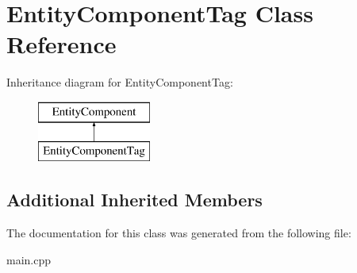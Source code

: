 \hypertarget{class_entity_component_tag}{}\section{Entity\+Component\+Tag Class Reference}
\label{class_entity_component_tag}
Inheritance diagram for Entity\+Component\+Tag\+:\begin{figure}[H]
\begin{center}
\leavevmode
\includegraphics[height=2.000000cm]{class_entity_component_tag}
\end{center}
\end{figure}
\subsection*{Additional Inherited Members}


The documentation for this class was generated from the following file\+:\begin{DoxyCompactItemize}
\item 
main.\+cpp\end{DoxyCompactItemize}
